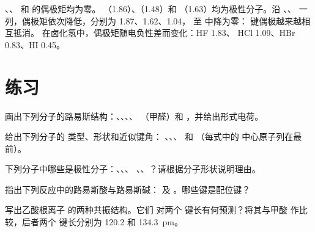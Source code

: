 \begin{example}[极性分子与非极性分子]\label{ex:b1:lewis-resonance-vsepr:dipoles}
、、 和  的偶极矩均为零。
（\qty{1.86}{\debye}）、（\qty{1.48}{\debye}）和
（\qty{1.63}{\debye}）均为极性分子。沿 、、
 一列，偶极矩依次降低，分别为 1.87、1.62、\qty{1.04}{\debye}，
至  中降为零： 键偶极越来越相互抵消。
在卤化氢中，偶极矩随电负性差而变化：HF 1.83、
HCl 1.09、HBr 0.83、HI \qty{0.45}{\debye}。
\end{example}

\section{练习}

\begin{exercise}[$\star$]\label{exo:b1:lewis-resonance-vsepr:1}
画出下列分子的路易斯结构：、、、、
（甲醛）和 ，并给出形式电荷。
\end{exercise}

\begin{exercise}[$\star$]\label{exo:b1:lewis-resonance-vsepr:2}
给出下列分子的  类型、形状和近似键角：
、、、 和 （每式中的
中心原子列在最前）。
\end{exercise}

\begin{exercise}[$\star$]\label{exo:b1:lewis-resonance-vsepr:3}
下列分子中哪些是极性分子：、、、
、、？请根据分子形状说明理由。
\end{exercise}

\begin{exercise}[$\star$]\label{exo:b1:lewis-resonance-vsepr:4}
指出下列反应中的路易斯酸与路易斯碱： 及
。哪些键是配位键？
\end{exercise}

\begin{exercise}[$\star\star$]\label{exo:b1:lewis-resonance-vsepr:5}
写出乙酸根离子  的两种共振结构。它们
对两个  键长有何预测？将其与甲酸
 作比较，后者两个  键长分别为 120.2 和
\qty{134.3}{pm}。
\end{exercise}

